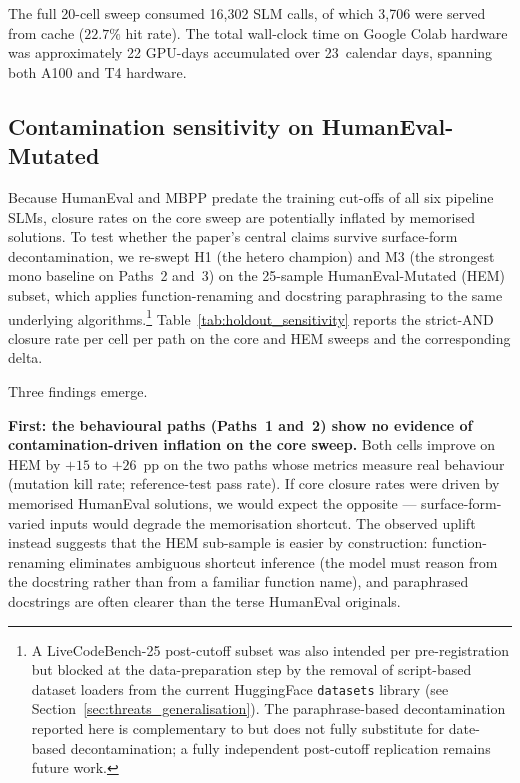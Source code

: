 The full 20-cell sweep consumed 16{,}302 SLM calls, of which 3{,}706 were served from cache ($22.7\%$ hit rate). The total wall-clock time on Google Colab hardware was approximately 22 GPU-days accumulated over 23~calendar days, spanning both A100 and T4 hardware.

\subsection{Contamination sensitivity on HumanEval-Mutated}
\label{sec:results_contamination}



Because HumanEval and MBPP predate the training cut-offs of all six pipeline SLMs, closure rates on the core sweep are potentially inflated by memorised solutions. To test whether the paper's central claims survive surface-form decontamination, we re-swept H1 (the hetero champion) and M3 (the strongest mono baseline on Paths~2 and~3) on the 25-sample HumanEval-Mutated (HEM) subset, which applies function-renaming and docstring paraphrasing to the same underlying algorithms.\footnote{A LiveCodeBench-25 post-cutoff subset was also intended per pre-registration but blocked at the data-preparation step by the removal of script-based dataset loaders from the current HuggingFace \texttt{datasets} library (see Section~\ref{sec:threats_generalisation}). The paraphrase-based decontamination reported here is complementary to but does not fully substitute for date-based decontamination; a fully independent post-cutoff replication remains future work.} Table~\ref{tab:holdout_sensitivity} reports the strict-AND closure rate per cell per path on the core and HEM sweeps and the corresponding delta.

Three findings emerge.

\textbf{First: the behavioural paths (Paths~1 and~2) show no evidence of contamination-driven inflation on the core sweep.} Both cells improve on HEM by $+15$ to $+26$~pp on the two paths whose metrics measure real behaviour (mutation kill rate; reference-test pass rate). If core closure rates were driven by memorised HumanEval solutions, we would expect the opposite --- surface-form-varied inputs would degrade the memorisation shortcut. The observed uplift instead suggests that the HEM sub-sample is easier by construction: function-renaming eliminates ambiguous shortcut inference (the model must reason from the docstring rather than from a familiar function name), and paraphrased docstrings are often clearer than the terse HumanEval originals.

